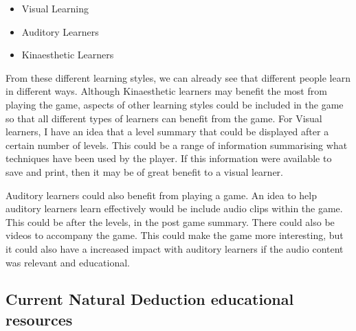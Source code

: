 \documentclass[a4paper]{article}
\begin{document}
\begin{itemize}
\item{Visual Learning}
\item{Auditory Learners}
\item{Kinaesthetic Learners}
\end{itemize}

\cite{mcdonald2012different} \cite{montemayor2009learning}

From these different learning styles, we can already see that different people learn in different ways. Although Kinaesthetic learners may benefit the most from playing the game, aspects of other learning styles could be included in the game so that all different types of learners can benefit from the game. For Visual learners, I have an idea that a level summary that could be displayed after a certain number of levels. This could be a range of information summarising what techniques have been used by the player. If this information were available to save and print, then it may be of great benefit to a visual learner.

Auditory learners could also benefit from playing a game. An idea to help auditory learners learn effectively would be include audio clips within the game. This could be after the levels, in the post game summary. There could also be videos to accompany the game. This could make the game more interesting, but it could also have a increased impact with auditory learners if the audio content was relevant and educational.

\subsection{Current Natural Deduction educational resources}
\end{document}
